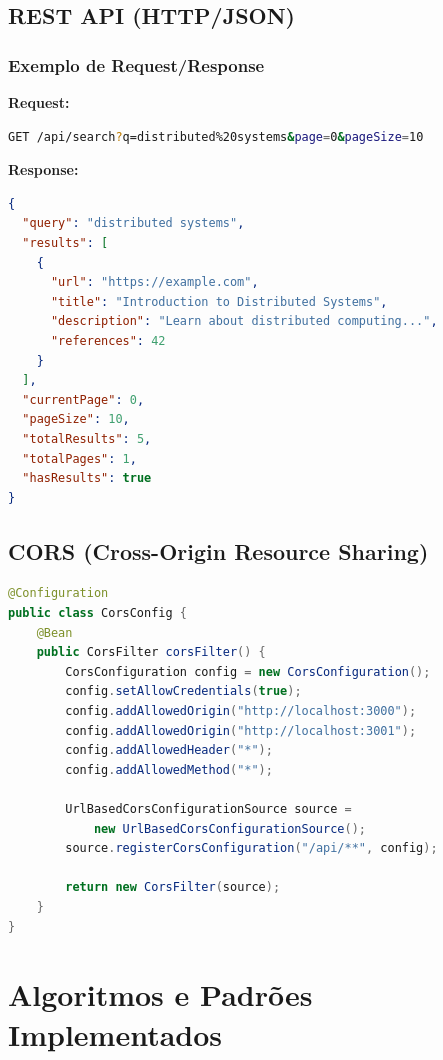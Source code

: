 \documentclass[12pt,a4paper]{article}
\begin{document}
\subsection{REST API (HTTP/JSON)}

\subsubsection{Exemplo de Request/Response}

\textbf{Request:}
\begin{lstlisting}[language=bash]
GET /api/search?q=distributed%20systems&page=0&pageSize=10
\end{lstlisting}

\textbf{Response:}
\begin{lstlisting}[language=JSON]
{
  "query": "distributed systems",
  "results": [
    {
      "url": "https://example.com",
      "title": "Introduction to Distributed Systems",
      "description": "Learn about distributed computing...",
      "references": 42
    }
  ],
  "currentPage": 0,
  "pageSize": 10,
  "totalResults": 5,
  "totalPages": 1,
  "hasResults": true
}
\end{lstlisting}

\subsection{CORS (Cross-Origin Resource Sharing)}

\begin{lstlisting}[language=Java, caption={Configuração CORS}]
@Configuration
public class CorsConfig {
    @Bean
    public CorsFilter corsFilter() {
        CorsConfiguration config = new CorsConfiguration();
        config.setAllowCredentials(true);
        config.addAllowedOrigin("http://localhost:3000");
        config.addAllowedOrigin("http://localhost:3001");
        config.addAllowedHeader("*");
        config.addAllowedMethod("*");
        
        UrlBasedCorsConfigurationSource source = 
            new UrlBasedCorsConfigurationSource();
        source.registerCorsConfiguration("/api/**", config);
        
        return new CorsFilter(source);
    }
}
\end{lstlisting}

\newpage

\section{Algoritmos e Padrões Implementados}
\end{document}
